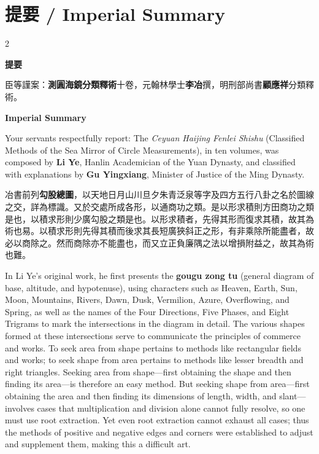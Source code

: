 \documentclass[11pt,a4paper]{article}
\begin{document}
\section*{提要 / Imperial Summary}

\begin{paracol}{2}

\noindent\textbf{提要}

\medskip

臣等謹案：\textbf{測圓海鏡分類釋術}十卷，元翰林學士\textbf{李冶}撰，明刑部尚書\textbf{顧應祥}分類釋術。

\switchcolumn

\noindent\textbf{Imperial Summary}

\medskip

Your servants respectfully report: The \textit{Ceyuan Haijing Fenlei Shishu} (Classified Methods of the Sea Mirror of Circle Measurements), in ten volumes, was composed by \textbf{Li Ye}, Hanlin Academician of the Yuan Dynasty, and classified with explanations by \textbf{Gu Yingxiang}, Minister of Justice of the Ming Dynasty.

\switchcolumn

冶書前列\textbf{勾股總圖}，以天地日月山川旦夕朱青泛泉等字及四方五行八卦之名於圖線之交，詳為標識。又於交處所成各形，以通商功之類。是以形求積則方田商功之類是也，以積求形則少廣勾股之類是也。以形求積者，先得其形而復求其積，故其為術也易。以積求形則先得其積而後求其長短廣狹斜正之形，有非乘除所能盡者，故必以商除之。然而商除亦不能盡也，而又立正負廉隅之法以增損附益之，故其為術也難。

\switchcolumn

In Li Ye's original work, he first presents the \textbf{gougu zong tu} (general diagram of base, altitude, and hypotenuse), using characters such as Heaven, Earth, Sun, Moon, Mountains, Rivers, Dawn, Dusk, Vermilion, Azure, Overflowing, and Spring, as well as the names of the Four Directions, Five Phases, and Eight Trigrams to mark the intersections in the diagram in detail. The various shapes formed at these intersections serve to communicate the principles of commerce and works. To seek area from shape pertains to methods like rectangular fields and works; to seek shape from area pertains to methods like lesser breadth and right triangles. Seeking area from shape---first obtaining the shape and then finding its area---is therefore an easy method. But seeking shape from area---first obtaining the area and then finding its dimensions of length, width, and slant---involves cases that multiplication and division alone cannot fully resolve, so one must use root extraction. Yet even root extraction cannot exhaust all cases; thus the methods of positive and negative edges and corners were established to adjust and supplement them, making this a difficult art.


\end{paracol}
\end{document}

